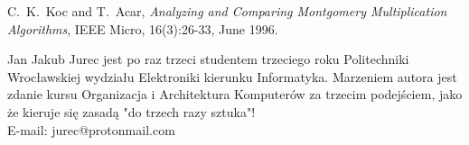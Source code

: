 \documentclass[10pt,journal,compsoc]{IEEEtran}
\begin{document}
\ifCLASSOPTIONcaptionsoff
  \newpage
\fi





%
%
%
\begin{thebibliography}{1}

C.~K.~Koc and T.~Acar, \emph{Analyzing and Comparing Montgomery Multiplication Algorithms}, IEEE Micro, 16(3):26-33, June 1996.

\end{thebibliography}

% 
\begin{IEEEbiography}{Jan Jakub Jurec} jest po raz trzeci studentem trzeciego roku Politechniki Wrocławskiej wydziału Elektroniki kierunku Informatyka. Marzeniem autora jest zdanie kursu Organizacja i Architektura Komputerów za trzecim podejściem, jako że kieruje się zasadą "do trzech razy sztuka"! \\
E-mail: jurec@protonmail.com
\end{IEEEbiography}
\end{document}
